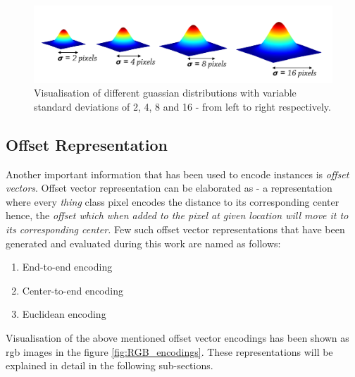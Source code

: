 \begin{figure}[!ht]
    \includegraphics[width = \textwidth]{Graphics/Data_Representation/distributions}
    \caption[Different Distribution Sizes]{Visualisation of different guassian distributions with variable  standard deviations of  2, 4, 8 and 16 - from left to right respectively.}
    \label{fig:distsizes}
\end{figure}



\subsection{Offset Representation}

\label{subsec:offsets}
Another important information that has been used to encode instances is\textit{ offset vectors}. Offset vector representation can be elaborated as - a representation where every \textit{thing} class pixel encodes the distance to its corresponding center hence, the \textit{offset which when added to the pixel at given location will move it to its corresponding center.} Few such offset vector representations that have been generated and evaluated during this work are named as follows:

\begin{enumerate}

    \item End-to-end encoding
    \item Center-to-end encoding 
    \item Euclidean encoding

\end{enumerate}

Visualisation of the above mentioned offset vector encodings has been shown as rgb images in the figure \ref{fig:RGB_encodings}. These representations will be explained in detail in the following sub-sections.


